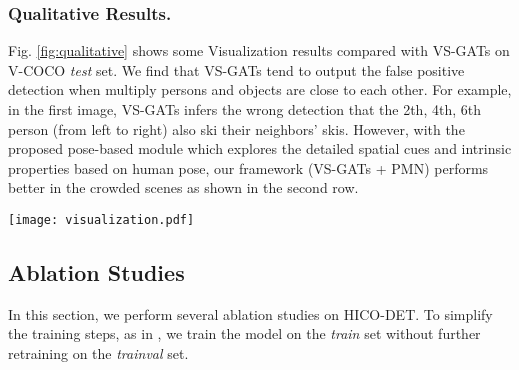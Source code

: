 \documentclass[10pt,twocolumn,letterpaper]{article}
\begin{document}
\subsubsection{Qualitative Results.} \label{subsubSec:qualitative_result}
Fig. \ref{fig:qualitative} shows some Visualization results compared with VS-GATs on V-COCO \textit{test} set. We find that VS-GATs tend to output the false positive detection when multiply persons and objects are close to each other. For example, in the first image, VS-GATs infers the wrong detection that the 2th, 4th, 6th person (from left to right) also ski their neighbors' skis. However, with the proposed pose-based module which explores the detailed spatial cues and intrinsic properties based on human pose, our framework (VS-GATs + PMN) performs better in the crowded scenes as shown in the second row.
\begin{figure*}[t]
    \centering
    \texttt{[image: visualization.pdf]}
    \caption{HOI detection results compared with VS-GATs on V-COCO \textit{test} set. The first row is the detection results of original VS-GATs. The second row is the detection results of our framework (VS-GATs + PMN). Subjects and objects are shown in orange bounding boxes.The interaction classes are shown on the subject bounding box and the interactive objects are linked with the line in the same color. We show all triplets whose inferred \textit{action score} exceeds 0.5.}
    \label{fig:qualitative}
\end{figure*}
\subsection{Ablation Studies} \label{subsec:ablationStudies}
In this section, we perform several ablation studies on HICO-DET. To simplify the training steps, as in \cite{liang2020visualsemantic}, we train the model on the \textit{train} set without further retraining on the \textit{trainval} set.
\end{document}
